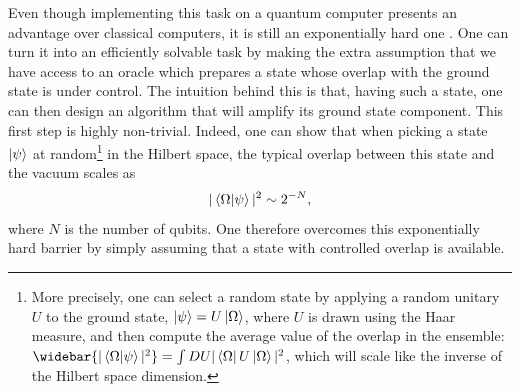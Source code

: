\documentclass[a4paper,11pt]{article}
\begin{document}
Even though implementing this task on a quantum computer presents an advantage over classical computers, it is still an exponentially hard one \cite{TCS-066}. One can turn it into an efficiently solvable task by making the extra assumption that we have access to an oracle which prepares a state whose overlap with the ground state is under control. The intuition behind this is that, having such a state, one can then design an algorithm that will amplify its ground state component. This first step is highly non-trivial. Indeed, one can show that when picking a state $\ket{\psi}$ at random\footnote{More precisely, one can select a random state by applying a random unitary $U$ to the ground state, $\ket{\psi}=U\ket{\Omega}$, where $U$ is drawn using the Haar measure, and then compute the average value of the overlap in the ensemble: $\widebar{|\braket{\Omega}{\psi}|^2} = \int DU |\bra{\Omega}U\ket{\Omega}|^2$, which will scale like the inverse of the Hilbert space dimension.} in the Hilbert space, the typical overlap between this state and the vacuum scales as
\begin{equation}
    |\braket{\Omega}{\psi}|^2\sim 2^{-N},
\end{equation}
where $N$ is the number of qubits. One therefore overcomes this exponentially hard barrier by simply assuming that a state with controlled overlap is available.
\end{document}
